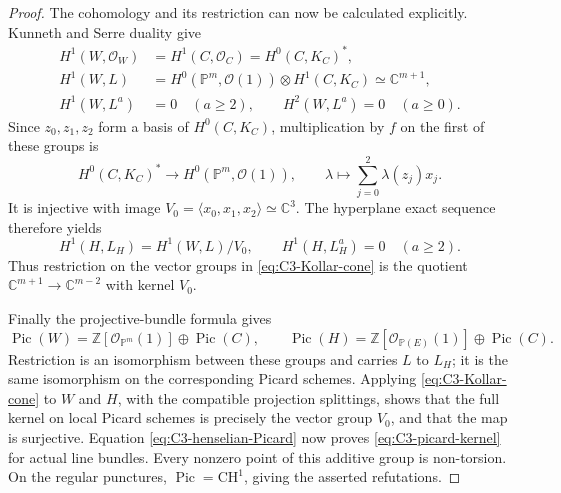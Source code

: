\begin{proof}
The cohomology and its restriction can now be calculated
explicitly. Kunneth and Serre duality give
\[
 \begin{aligned}
 H^1(W,\mathcal O_W)&=H^1(C,\mathcal O_C)
                           =H^0(C,K_C)^*,\\
 H^1(W,L)&=H^0(\mathbb P^m,\mathcal O(1))
                            \otimes H^1(C,K_C)
                              \simeq\mathbb C^{m+1},\\
 H^1(W,L^a)&=0\quad(a\ge2),\qquad
 H^2(W,L^a)=0\quad(a\ge0).
 \end{aligned}
\]
Since $z_0,z_1,z_2$ form a basis of $H^0(C,K_C)$,
multiplication by $f$ on the first of these groups is
\[
 H^0(C,K_C)^*\longrightarrow
                H^0(\mathbb P^m,\mathcal O(1)),\qquad
 \lambda\longmapsto\sum_{j=0}^{2}\lambda(z_j)x_j.
\]
It is injective with image
$V_0=\langle x_0,x_1,x_2\rangle\simeq\mathbb C^3$.
The hyperplane exact sequence therefore yields
\[
 H^1(H,L_H)=H^1(W,L)/V_0,
 \qquad H^1(H,L_H^a)=0\quad(a\ge2).
\]
Thus restriction on the vector groups in
\eqref{eq:C3-Kollar-cone} is the quotient
$\mathbb C^{m+1}\to\mathbb C^{m-2}$ with kernel $V_0$.

Finally the projective-bundle formula gives
\[
 \operatorname{Pic}(W)=\mathbb Z[\mathcal O_{\mathbb P^m}(1)]
                              \oplus\operatorname{Pic}(C),
 \qquad
 \operatorname{Pic}(H)=\mathbb Z[\mathcal O_{\mathbb P(E)}(1)]
                              \oplus\operatorname{Pic}(C).
\]
Restriction is an isomorphism between these groups and
carries $L$ to $L_H$; it is the same isomorphism on the
corresponding Picard schemes. Applying
\eqref{eq:C3-Kollar-cone} to $W$ and $H$, with the
compatible projection splittings, shows that the full
kernel on local Picard schemes is precisely the
vector group $V_0$, and that the map is surjective.
Equation \eqref{eq:C3-henselian-Picard} now proves
\eqref{eq:C3-picard-kernel} for actual line bundles.
Every nonzero point of this additive group is
non-torsion. On the regular punctures,
$\operatorname{Pic}=\mathrm{CH}^1$, giving the asserted
refutations.
\end{proof}

